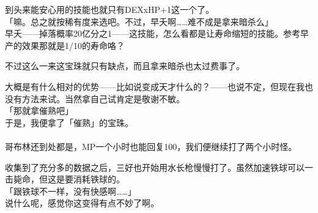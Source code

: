 到头来能安心用的技能也就只有DEXxHP+1这一个了。\\

「嘛。总之就按稀有度来选吧。不过，早夭啊……难不成是拿来暗杀么」\\

早夭——掉落概率20亿分之1——这技能，怎么看都是让寿命缩短的技能。参考早产的效果那就是1/10的寿命咯？

不过这么一来这宝珠就只有缺点，而且拿来暗杀也太过费事了。

大概是有什么相对的优势——比如说变成天才什么的？——也说不定，但现在我也没有方法来试。当然拿自己试肯定是敬谢不敏。\\

「那就拿催熟吧」\\

于是，我便拿了「催熟」的宝珠。\\

\sqsplit\\

哥布林还到处都是，MP一个小时也能回复100，我们便继续打了两个小时怪。

收集到了充分多的数据之后，三好也开始用水长枪慢慢打了。虽然加速铁球可以一击毙命，但这是要消耗铁球的。\\

「跟铁球不一样，没有快感啊……」\\

说什么呢，感觉你这变得有点不妙了啊。\\

